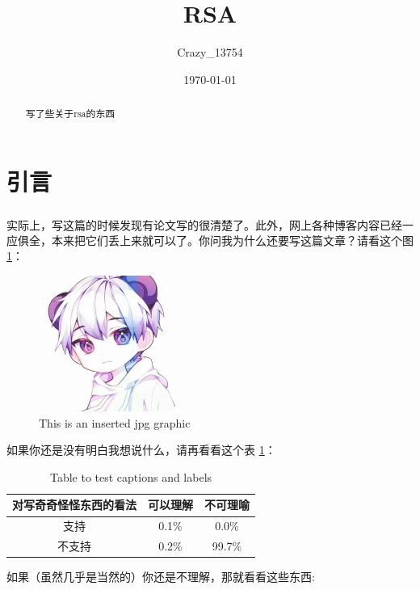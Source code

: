 \documentclass[a4paper]{article}  %
\title{\heiti\zihao{2} RSA}
\author{\songti Crazy\_13754}
\date{\today}
\newcommand{\upcite}[1]{\textsuperscript{\textsuperscript{\cite{#1}}}} %
\begin{document}
\maketitle
\begin{abstract}
	写了些关于rsa的东西
\end{abstract}
\tableofcontents
\section[引言]{引言}

实际上，写这篇的时候发现有论文写的很清楚了\upcite{chenchuanbo2006rsa}。此外，网上各种博客内容已经一应俱全，本来把它们丢上来就可以了。你问我为什么还要写这篇文章？请看这个图 \ref{fig:rsa1}：

\begin{figure}[htbp]
	\centering
	\includegraphics[width=1.77in,height=1.75in]{contents/rsa1.jpg}
	\caption{This is an inserted jpg graphic}
	\label{fig:rsa1}
\end{figure}

如果你还是没有明白我想说什么，请再看看这个表 \ref{table:1}：

\begin{table}[h!]
	\centering
	\begin{tabular}{ c c c }
		\hline
		对写奇奇怪怪东西的看法 & 可以理解  & 不可理喻   \\
		\hline
		支持          & 0.1\% & 0.0\%  \\
		不支持         & 0.2\% & 99.7\% \\
		\hline
	\end{tabular}
	\caption{Table to test captions and labels}
	\label{table:1}
\end{table}

如果（虽然几乎是当然的）你还是不理解，那就看看这些东西:
\end{document}
